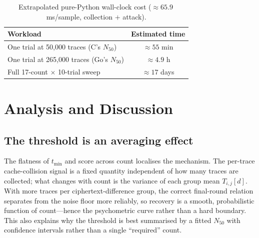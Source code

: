 \documentclass[11pt]{article}
\begin{document}
\begin{table}[t]
\centering
\caption{Extrapolated pure-Python wall-clock cost ($\approx65.9$\,ms/sample,
collection $+$ attack).}
\label{tab:python}
\begin{tabular}{lc}
\toprule
Workload & Estimated time \\
\midrule
One trial at 50{,}000 traces (C's $N_{50}$)   & $\approx 55$ min \\
One trial at 265{,}000 traces (Go's $N_{50}$) & $\approx 4.9$ h \\
Full 17-count $\times$ 10-trial sweep         & $\approx 17$ days \\
\bottomrule
\end{tabular}
\end{table}

\section{Analysis and Discussion}
\label{sec:analysis}

\subsection{The threshold is an averaging effect}
\label{sec:an-statistical}
The flatness of $t_{\min}$ and score across count localises the mechanism. The
per-trace cache-collision signal is a fixed quantity independent of how many
traces are collected; what changes with count is the variance of each group mean
$T_{i,j}[d]$. With more traces per ciphertext-difference group, the correct
final-round relation separates from the noise floor more reliably, so recovery is
a smooth, probabilistic function of count---hence the psychometric curve rather
than a hard boundary. This also explains why the threshold is best summarised by
a fitted $N_{50}$ with confidence intervals rather than a single ``required''
count.
\end{document}
